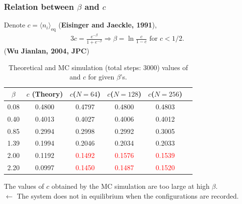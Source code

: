 \documentclass[8pt]{beamer}
\begin{document}
\begin{frame}
	\frametitle{Relation between $\beta$ and $c$}
	Denote $c = \langle n_i \rangle_{\text{eq}}$ (\textbf{Eisinger and Jaeckle, 1991}),
	\begin{alignat}{3}
		c= \frac{e^{-\beta}}{1+ e^{-\beta}} \Rightarrow \beta = \ln \frac{c}{1-c} \text{ for } c < 1/2.
	\end{alignat}
	(\textbf{Wu Jianlan, 2004, JPC})	
	\begin{table}[htbp]
		\centering
				\caption{\label{tab:table_lino3} Theoretical and MC simulation (total steps: 3000) values of and $c$ for given $\beta$'s.}
		\begin{tabular}{cccccc}
			$\beta$ & $c$ (Theory) & $c$($N=64$) & $c$($N=128$) &$c$($N=256$) \\
			\hline
			0.08 & 0.4800  &  0.4797 & 0.4800 & 0.4803 \\
			0.40 & 0.4013 & 0.4027 & 0.4006 & 0.4012 \\
			0.85 & 0.2994 & 0.2998 & 0.2992  & 0.3005 \\
			1.39 & 0.1994 & 0.2046 & 0.2034 & 0.2033 \\
			2.00 & 0.1192 & \textcolor{red}{0.1492} & \textcolor{red}{0.1576} & \textcolor{red}{0.1539}\\
			2.20 & 0.0997 & \textcolor{red}{0.1450} & \textcolor{red}{0.1487} & \textcolor{red}{0.1520}
		\end{tabular}
	\end{table}
	The values of $c$ obtained by the MC simulation are too large at high $\beta$.\\ $\leftarrow$ The system does not in equilibrium when the configurations are recorded. 
\end{frame}
\end{document}
